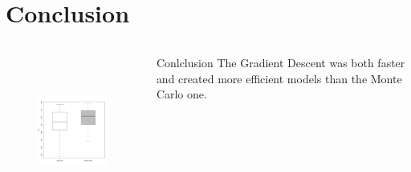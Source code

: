 \documentclass[presentation]{beamer}   %
\begin{document}
\section{Conclusion}
\begin{frame}
  \begin{columns}[t] %
		\begin{figure}
		\centering
			\includegraphics[width=50mm,height=50mm]{fig/boxplot.pdf}
		\end{figure}
		\centering
		\begin{block}{Conlclusion}
			The Gradient Descent was both faster and created more efficient models than the Monte Carlo one.
		\end{block}
  \end{columns}
\end{frame}
\end{document}
